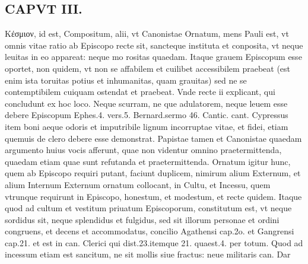 \documentclass{article}
\begin{document}
\begin{pages}
\section*{CAPVT  III. }
\marginpar{[ p.121 ]}\pstart Κέσμιον, id est, Compositum, alii, vt Canonistae Ornatum, mens Pauli est, vt omnis vitae ratio ab Episcopo recte sit, sancteque instituta et conposita, vt neque leuitas in eo appareat: neque mo rositas quaedam. Itaque grauem Episcopum esse oportet, non quidem, vt non se affabilem et cuilibet accessibilem praebeat (est enim ista toruitas potius et inhumanitas, quam grauitas) sed ne se contemptibilem cuiquam ostendat et praebeat. Vnde recte ii explicant, qui concludunt ex hoc loco. Neque scurram, ne que adulatorem, neque leuem esse debere Episcopum Ephes.4. vers.5. Bernard.sermo 46. Cantic. cant. Cypressus item boni aeque odoris et imputribile lignum incorruptae vitae, et fidei, etiam quemuis de clero debere esse demonstrat.  \pend\pstart Papistae tamen et Canonistae quaedam argumento huius vocis afferunt, quae non videntur omnino praetermittenda, quaedam etiam quae sunt refutanda et praetermittenda. Ornatum igitur hunc, quem ab Episcopo requiri putant, faciunt duplicem, nimirum alium Externum, et alium Internum Externum ornatum collocant, in Cultu, et Incessu, quem vtrunque requirunt in Episcopo, honestum, et modestum, et recte quidem. Itaque quod ad cultum et vestitum priuatum Episcoporum, constitutum est, vt neque sordidus sit, neque  splendidus et fulgidus, sed sit illorum personae et ordini congruens, et decens et accommodatus, concilio Agathensi cap.2o. et Gangrensi cap.21. et est in can. Clerici qui dist.23.itemque 21. quaest.4. per totum. Quod ad incessum etiam est sancitum, ne sit mollis siue fractus: neue militaris can. Dar\pend

\end{pages}
\end{document}
